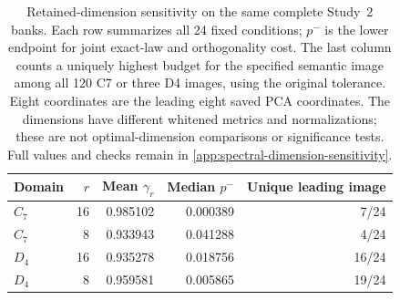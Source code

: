 \begin{table}[t]
\centering\small
\setlength{\tabcolsep}{5pt}
\begin{tabular}{@{}lrrrr@{}}
\toprule
Domain & $r$ & Mean $\gamma_r$ & Median $p^-$ & Unique leading image \\
\midrule
$C_7$ & 16 & 0.985102 & 0.000389 & 7/24 \\
$C_7$ & 8 & 0.933943 & 0.041288 & 4/24 \\
\addlinespace
$D_4$ & 16 & 0.935278 & 0.018756 & 16/24 \\
$D_4$ & 8 & 0.959581 & 0.005865 & 19/24 \\
\bottomrule
\end{tabular}
\caption{Retained-dimension sensitivity on the same complete Study~2 banks. Each row summarizes all 24 fixed conditions; $p^-$ is the lower endpoint for joint exact-law and orthogonality cost. The last column counts a uniquely highest budget for the specified semantic image among all 120 C7 or three D4 images, using the original tolerance. Eight coordinates are the leading eight saved PCA coordinates. The dimensions have different whitened metrics and normalizations; these are not optimal-dimension comparisons or significance tests. Full values and checks remain in \cref{app:spectral-dimension-sensitivity}.}
\label{tab:sensitivity-main}
\end{table}
